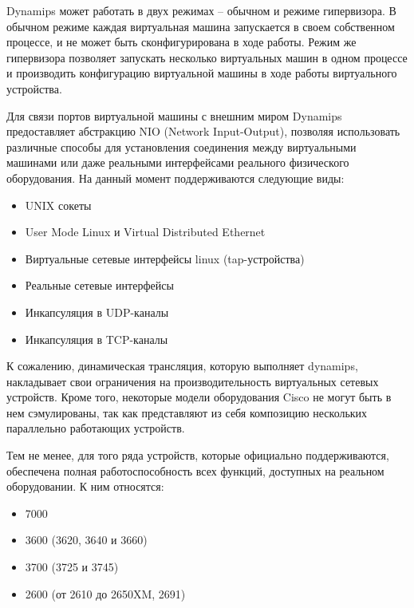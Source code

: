 Dynamips может работать в двух режимах -- обычном и режиме гипервизора. В обычном режиме
каждая виртуальная машина запускается в своем собственном процессе, и не может быть
сконфигурирована в ходе работы. Режим же гипервизора позволяет запускать несколько 
виртуальных машин в одном процессе и производить конфигурацию виртуальной машины 
в ходе работы виртуального устройства.

Для связи портов виртуальной машины с внешним миром Dynamips предоставляет абстракцию
NIO (Network Input-Output), позволяя использовать различные способы для установления
соединения между виртуальными машинами или даже реальными интерфейсами реального
физического оборудования. На данный момент поддерживаются следующие виды:
\begin{itemize}
    \item UNIX сокеты
    \item User Mode Linux и Virtual Distributed Ethernet  %
    \item Виртуальные сетевые интерфейсы linux (tap-устройства)
    \item Реальные сетевые интерфейсы
    \item Инкапсуляция в UDP-каналы
    \item Инкапсуляция в TCP-каналы
\end{itemize}

К сожалению, динамическая трансляция, которую выполняет dynamips, накладывает свои
ограничения на производительность виртуальных сетевых устройств. Кроме того,
некоторые модели оборудования Cisco не могут быть в нем сэмулированы, так как представляют
из себя композицию нескольких параллельно работающих устройств.

Тем не менее, для того ряда устройств, которые официально поддерживаются, обеспечена
полная работоспособность всех функций, доступных на реальном оборудовании. К ним
относятся:
\begin{itemize}
    \item 7000
    \item 3600 (3620, 3640 и 3660)
    \item 3700 (3725 и 3745)
    \item 2600 (от 2610 до 2650XM, 2691)
\end{itemize}


